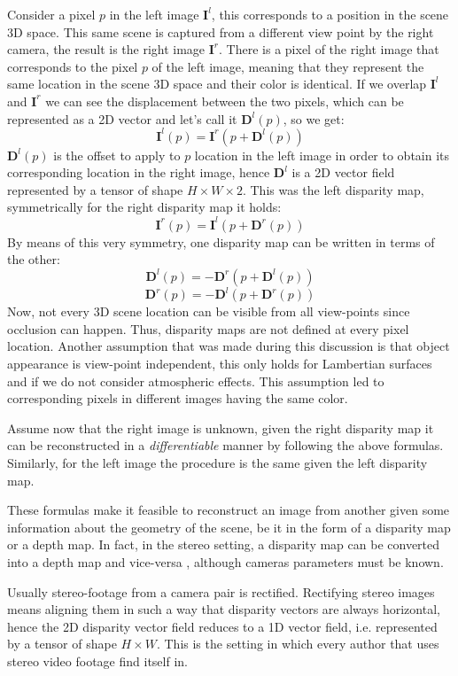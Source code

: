 Consider a pixel $p$ in the left image $\mathbf{I}^{l}$, this corresponds to a position in the scene 3D space.
This same scene is captured from a different view point by the right camera, the result is the right image $\mathbf{I}^{r}$.
There is a pixel of the right image that corresponds to the pixel $p$ of the left image, meaning that they represent the same location in the scene 3D space and their color is identical.
If we overlap $\mathbf{I}^{l}$ and $\mathbf{I}^{r}$ we can see the displacement between the two pixels, which can be represented as a 2D vector and let's call it $\mathbf{D}^{l}(p)$, so we get:
\[
	\mathbf{I}^{l}(p) = \mathbf{I}^{r}(p + \mathbf{D}^{l}(p))
\]
$\mathbf{D}^{l}(p)$ is the offset to apply to $p$ location in the left image in order to obtain its corresponding location in the right image, hence $\mathbf{D}^{l}$ is a 2D vector field represented by a tensor of shape $H \times W \times 2$.
This was the left disparity map, symmetrically for the right disparity map it holds:
\[
	\mathbf{I}^{r}(p) = \mathbf{I}^{l}(p + \mathbf{D}^{r}(p))
\]
By means of this very symmetry, one disparity map can be written in terms of the other:
\[
\mathbf{D}^{l}(p) = - \mathbf{D}^{r}(p + \mathbf{D}^{l}(p))
\]\[
\mathbf{D}^{r}(p) = - \mathbf{D}^{l}(p + \mathbf{D}^{r}(p))
\]
Now, not every 3D scene location can be visible from all view-points since occlusion can happen.
Thus, disparity maps are not defined at every pixel location.
Another assumption that was made during this discussion is that object appearance is view-point independent, this only holds for Lambertian surfaces and if we do not consider atmospheric effects.
This assumption led to corresponding pixels in different images having the same color.

Assume now that the right image is unknown, given the right disparity map it can be reconstructed in a \textit{differentiable} manner by following the above formulas.
Similarly, for the left image the procedure is the same given the left disparity map.

These formulas make it feasible to reconstruct an image from another given some information about the geometry of the scene, be it in the form of a disparity map or a depth map.
In fact, in the stereo setting, a disparity map can be converted into a depth map and vice-versa \cite{multiview}, although cameras parameters must be known.

Usually stereo-footage from a camera pair is rectified.
Rectifying stereo images means aligning them in such a way that disparity vectors are always horizontal, hence the 2D disparity vector field reduces to a 1D vector field, i.e. represented by a tensor of shape $H \times W$.
This is the setting in which every author that uses stereo video footage find itself in.

